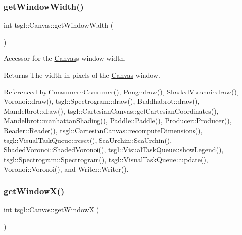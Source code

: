 \mbox{\label{classtsgl_1_1_canvas_a086a0322f4a6ab27da6929b1aa0593af}} 
\subsubsection{\texorpdfstring{get\+Window\+Width()}{getWindowWidth()}}
{\footnotesize\ttfamily int tsgl\+::\+Canvas\+::get\+Window\+Width (\begin{DoxyParamCaption}{ }\end{DoxyParamCaption})}



Accessor for the \hyperlink{classtsgl_1_1_canvas}{Canvas}\textquotesingle{}s window width. 

\begin{DoxyReturn}{Returns}
The width in pixels of the \hyperlink{classtsgl_1_1_canvas}{Canvas} window. 
\end{DoxyReturn}


Referenced by Consumer\+::\+Consumer(), Pong\+::draw(), Shaded\+Voronoi\+::draw(), Voronoi\+::draw(), tsgl\+::\+Spectrogram\+::draw(), Buddhabrot\+::draw(), Mandelbrot\+::draw(), tsgl\+::\+Cartesian\+Canvas\+::get\+Cartesian\+Coordinates(), Mandelbrot\+::manhattan\+Shading(), Paddle\+::\+Paddle(), Producer\+::\+Producer(), Reader\+::\+Reader(), tsgl\+::\+Cartesian\+Canvas\+::recompute\+Dimensions(), tsgl\+::\+Visual\+Task\+Queue\+::reset(), Sea\+Urchin\+::\+Sea\+Urchin(), Shaded\+Voronoi\+::\+Shaded\+Voronoi(), tsgl\+::\+Visual\+Task\+Queue\+::show\+Legend(), tsgl\+::\+Spectrogram\+::\+Spectrogram(), tsgl\+::\+Visual\+Task\+Queue\+::update(), Voronoi\+::\+Voronoi(), and Writer\+::\+Writer().

\mbox{\label{classtsgl_1_1_canvas_a011ce2354d4565f9d2a323411a47d52d}} 
\subsubsection{\texorpdfstring{get\+Window\+X()}{getWindowX()}}
{\footnotesize\ttfamily int tsgl\+::\+Canvas\+::get\+WindowX (\begin{DoxyParamCaption}{ }\end{DoxyParamCaption})}



